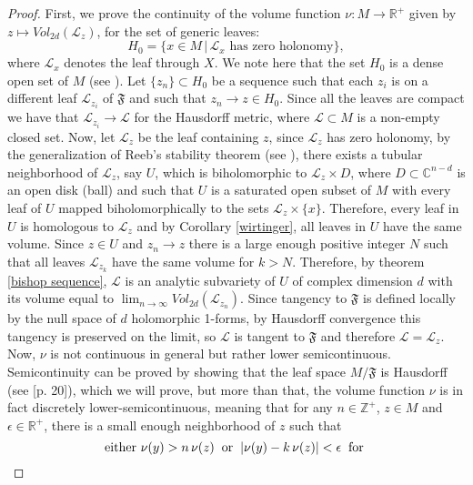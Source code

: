 \documentclass[letterpaper]{book}
\newcommand{\zah}{\ensuremath{ \mathbb Z }}
\newcommand{\co}{\ensuremath{\mathbb C }}
\newcommand{\re}{\ensuremath{\mathbb R }}
\begin{document}
\begin{proof}
First, we prove the continuity of the volume function $\nu:M\rightarrow\re^{+}$ given by
$z\mapsto Vol_{2d}(\mathcal{L}_z)$, for the set of generic leaves:
$$
H_0=\lbrace x\in M\,\vert\,\mathcal{L}_x\text{ has zero holonomy}\rbrace,
$$
where $\mathcal{L}_x$ denotes the leaf through $X$. We note here that the set $H_0$ is a dense
open set of $M$ (see \cite{EMT}). Let $\lbrace z_n\rbrace\subset H_0$ be a
sequence such that each $z_i$ is on a different leaf $\mathcal{L}_{z_i}$ of
$\mathfrak{F}$ and such that $z_n\rightarrow z\in H_0$. Since all the leaves
are compact we have that $\mathcal{L}_{z_i}\rightarrow\mathcal{L}$ for the
Hausdorff metric, where $\mathcal{L}\subset M$ is a non-empty closed set.
Now, let $\mathcal{L}_z$ be the leaf containing $z$, since $\mathcal{L}_z$ has zero
holonomy, by the generalization of Reeb's stability theorem (see \cite{Thurston}), there exists a tubular neighborhood of
$\mathcal{L}_z$, say $U$, which is biholomorphic to $\mathcal{L}_z\times D$,
where $D\subset\co^{n-d}$ is an open disk (ball) and such that $U$ is a
saturated open subset of $M$ with every leaf of $U$ mapped biholomorphically to
the sets $\mathcal{L}_z\times\lbrace x \rbrace$. Therefore, every leaf in $U$ is
homologous to $\mathcal{L}_z$ and by Corollary \ref{wirtinger}, all leaves in
$U$ have the same volume. Since $z\in U$ and $z_n\rightarrow z$ there is a
large enough positive integer $N$ such that all leaves $\mathcal{L}_{z_k}$ have
the same volume for $k>N$. Therefore, by theorem \ref{bishop sequence},
$\mathcal{L}$ is an analytic subvariety of $U$ of complex dimension $d$ with
its volume equal to $\lim_{n\rightarrow\infty} Vol_{2d}(\mathcal{L}_{z_n})$. Since
tangency to $\mathfrak{F}$ is defined locally by the null space of $d$ holomorphic
1-forms, by Hausdorff convergence this tangency
is preserved on the limit, so $\mathcal{L}$ is tangent to $\mathfrak{F}$ and therefore $\mathcal{L}=\mathcal{L}_z$. Now, $\nu$
is not continuous in general but rather lower semicontinuous. Semicontinuity can
be proved by showing that the leaf space $M/\mathfrak{F}$ is Hausdorff (see \cite{EMS}[p. 20]),
which we will prove, but more than that, the volume
function $\nu$ is in fact discretely lower-semicontinuous, meaning that for any
$n\in\zah^+$, $z\in M$ and $\epsilon\in\re^+$, there is a small enough
neighborhood of $z$ such that
$$
\text{either }\nu(y)>n\,\nu(z)\hspace{0.2cm}\text{or}\hspace{0.2cm}\vert\nu(y)-k\,\nu(z)\vert<\epsilon\hspace{0.2cm}\text{for
}$$
\end{proof}
\end{document}

